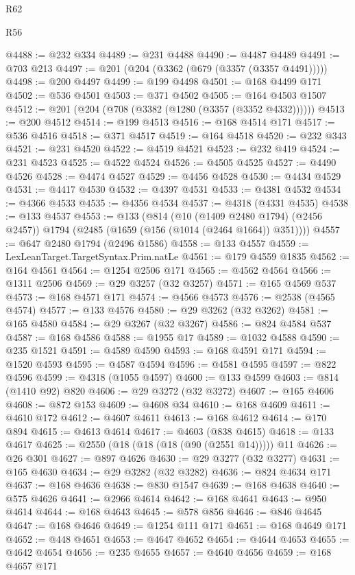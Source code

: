 \begin{lexlean}{R62}
\begin{lexlean}{R56}
\begin{coremodule}
{{{{{{{{{{{{{{{{{{{{{{{{{{{{{{{{{{{{{{{{{{{{{{{{{{{{{{{{{{{{{{{{{{{{{{{{{{{{{{{{{{{{{{{{{{{{{{{{{{{{{{{{{{{{{{{{{{{{{{{{{{{{{{{{{{{{{{{{{{{{{{{{{{{{{{{{{{{{{{{{{{{{{{{{{{{{{{{{{{{{{{{{{{{{{{{{{{{{{{{{{{{{{{{{{{{@4488 := @232 @334
@4489 := @231 @4488
@4490 := @4487 @4489
@4491 := @703 @213
@4497 := @201 (@204 (@3362 (@679 (@3357 (@3357 @4491)))))
@4498 := @200 @4497
@4499 := @199 @4498
@4501 := @168 @4499 @171
@4502 := @536 @4501
@4503 := @371 @4502
@4505 := @164 @4503 @1507
@4512 := @201 (@204 (@708 (@3382 (@1280 (@3357 (@3352 @4332))))))
@4513 := @200 @4512
@4514 := @199 @4513
@4516 := @168 @4514 @171
@4517 := @536 @4516
@4518 := @371 @4517
@4519 := @164 @4518
@4520 := @232 @343
@4521 := @231 @4520
@4522 := @4519 @4521
@4523 := @232 @419
@4524 := @231 @4523
@4525 := @4522 @4524
@4526 := @4505 @4525
@4527 := @4490 @4526
@4528 := @4474 @4527
@4529 := @4456 @4528
@4530 := @4434 @4529
@4531 := @4417 @4530
@4532 := @4397 @4531
@4533 := @4381 @4532
@4534 := @4366 @4533
@4535 := @4356 @4534
@4537 := @4318 (@4331 @4535)
@4538 := @133 @4537
@4553 := @133
    (@814
      (@10 (@1409 @2480 @1794) (@2456 @2457))
      @1794
      (@2485 (@1659 (@156 (@1014 (@2464 @1664)) @351))))
@4557 := @647 @2480 @1794 (@2496 @1586)
@4558 := @133 @4557
@4559 := LexLeanTarget.TargetSyntax.Prim.natLe
@4561 := @179 @4559 @1835
@4562 := @164 @4561
@4564 := @1254 @2506 @171
@4565 := @4562 @4564
@4566 := @1311 @2506
@4569 := @29 @3257 (@32 @3257)
@4571 := @165 @4569 @537
@4573 := @168 @4571 @171
@4574 := @4566 @4573
@4576 := @2538 (@4565 @4574)
@4577 := @133 @4576
@4580 := @29 @3262 (@32 @3262)
@4581 := @165 @4580
@4584 := @29 @3267 (@32 @3267)
@4586 := @824 @4584 @537
@4587 := @168 @4586
@4588 := @1955 @17
@4589 := @1032 @4588
@4590 := @235 @1521
@4591 := @4589 @4590
@4593 := @168 @4591 @171
@4594 := @1520 @4593
@4595 := @4587 @4594
@4596 := @4581 @4595
@4597 := @822 @4596
@4599 := @4318 (@1055 @4597)
@4600 := @133 @4599
@4603 := @814 (@1410 @92) @820
@4606 := @29 @3272 (@32 @3272)
@4607 := @165 @4606
@4608 := @872 @153
@4609 := @4608 @34
@4610 := @168 @4609
@4611 := @4610 @172
@4612 := @4607 @4611
@4613 := @168 @4612
@4614 := @170 @894
@4615 := @4613 @4614
@4617 := @4603 (@838 @4615)
@4618 := @133 @4617
@4625 := @2550 (@18 (@18 (@18 (@90 (@2551 @14))))) @11
@4626 := @26 @301
@4627 := @897 @4626
@4630 := @29 @3277 (@32 @3277)
@4631 := @165 @4630
@4634 := @29 @3282 (@32 @3282)
@4636 := @824 @4634 @171
@4637 := @168 @4636
@4638 := @830 @1547
@4639 := @168 @4638
@4640 := @575 @4626
@4641 := @2966 @4614
@4642 := @168 @4641
@4643 := @950 @4614
@4644 := @168 @4643
@4645 := @578 @856
@4646 := @846 @4645
@4647 := @168 @4646
@4649 := @1254 @111 @171
@4651 := @168 @4649 @171
@4652 := @448 @4651
@4653 := @4647 @4652
@4654 := @4644 @4653
@4655 := @4642 @4654
@4656 := @235 @4655
@4657 := @4640 @4656
@4659 := @168 @4657 @171
}}}}}}}}}}}}}}}}}}}}}}}}}}}}}}}}}}}}}}}}}}}}}}}}}}}}}}}}}}}}}}}}}}}}}}}}}}}}}}}}}}}}}}}}}}}}}}}}}}}}}}}}}}}}}}}}}}}}}}}}}}}}}}}}}}}}}}}}}}}}}}}}}}}}}}}}}}}}}}}}}}}}}}}}}}}}}}}}}}}}}}}}}}}}}}}}}}}}}}}}}}}}}}}}}}}
\end{coremodule}
\end{lexlean}
\end{lexlean}
